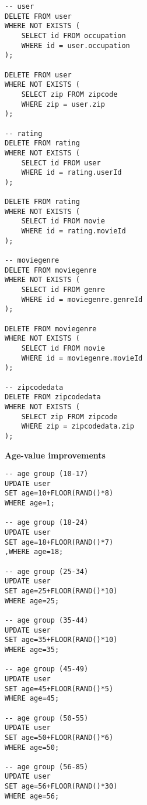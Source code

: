 \begin{lstlisting}
-- user
DELETE FROM user
WHERE NOT EXISTS (
	SELECT id FROM occupation
	WHERE id = user.occupation
);

DELETE FROM user
WHERE NOT EXISTS (
	SELECT zip FROM zipcode
	WHERE zip = user.zip
);

-- rating
DELETE FROM rating
WHERE NOT EXISTS (
	SELECT id FROM user
	WHERE id = rating.userId
);

DELETE FROM rating
WHERE NOT EXISTS (
	SELECT id FROM movie
	WHERE id = rating.movieId
);

-- moviegenre
DELETE FROM moviegenre
WHERE NOT EXISTS (
	SELECT id FROM genre
	WHERE id = moviegenre.genreId
);

DELETE FROM moviegenre
WHERE NOT EXISTS (
	SELECT id FROM movie
	WHERE id = moviegenre.movieId
);

-- zipcodedata
DELETE FROM zipcodedata
WHERE NOT EXISTS (
	SELECT zip FROM zipcode
	WHERE zip = zipcodedata.zip
);
\end{lstlisting}
\bigskip

\noindent\textbf{Age-value improvements} \\

\begin{lstlisting}
-- age group (10-17)
UPDATE user
SET age=10+FLOOR(RAND()*8)
WHERE age=1;

-- age group (18-24)
UPDATE user
SET age=18+FLOOR(RAND()*7)
,WHERE age=18;

-- age group (25-34)
UPDATE user
SET age=25+FLOOR(RAND()*10)
WHERE age=25;

-- age group (35-44)
UPDATE user
SET age=35+FLOOR(RAND()*10)
WHERE age=35;

-- age group (45-49)
UPDATE user
SET age=45+FLOOR(RAND()*5)
WHERE age=45;

-- age group (50-55)
UPDATE user
SET age=50+FLOOR(RAND()*6)
WHERE age=50;

-- age group (56-85)
UPDATE user
SET age=56+FLOOR(RAND()*30)
WHERE age=56;
\end{lstlisting}